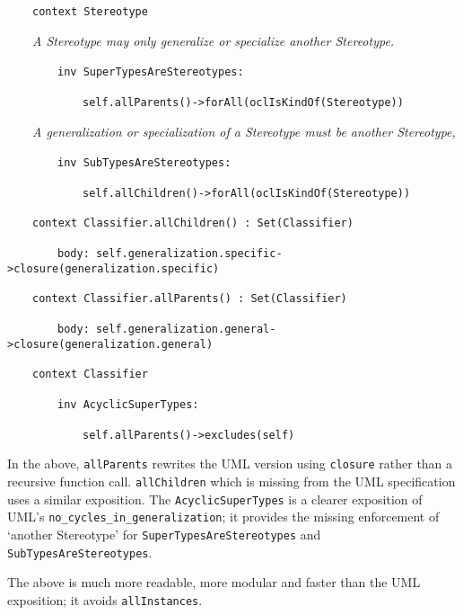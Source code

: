 \documentclass[
]{ceurart}
\begin{document}
\begin{description}[itemsep=-0.2cm]\small
\item ~~~~\verb!context Stereotype!
\item 
\item ~~~~\textit{A Stereotype may only generalize or specialize another Stereotype.}
\item 
\item ~~~~~~~~\verb!inv SuperTypesAreStereotypes:!
\item ~~~~~~~~~~~~\verb!self.allParents()->forAll(oclIsKindOf(Stereotype))!
\item 
\item ~~~~\textit{A generalization or specialization of a Stereotype must be another Stereotype,}
\item 
\item ~~~~~~~~\verb!inv SubTypesAreStereotypes:!
\item ~~~~~~~~~~~~\verb!self.allChildren()->forAll(oclIsKindOf(Stereotype))!
\item 
\item ~~~~\verb!context Classifier.allChildren() : Set(Classifier)!
\item ~~~~~~~~\verb!body: self.generalization.specific->closure(generalization.specific)!
\item 
\item ~~~~\verb!context Classifier.allParents() : Set(Classifier)!
\item ~~~~~~~~\verb!body: self.generalization.general->closure(generalization.general)!
\item 
\item ~~~~\verb!context Classifier!
\item ~~~~~~~~\verb!inv AcyclicSuperTypes:!
\item ~~~~~~~~~~~~\verb!self.allParents()->excludes(self)!
\end{description}

In the above, \verb!allParents! rewrites the UML version using \verb!closure! rather than a recursive function call. \verb!allChildren! which is missing from the UML specification uses a similar exposition. The \verb!AcyclicSuperTypes! is a clearer exposition of UML's \verb!no_cycles_in_generalization!; it provides the missing enforcement of `another Stereotype' for \verb!SuperTypesAreStereotypes! and \verb!SubTypesAreStereotypes!.

The above is much more readable, more modular and faster than the UML exposition; it avoids \verb!allInstances!.
\end{document}
